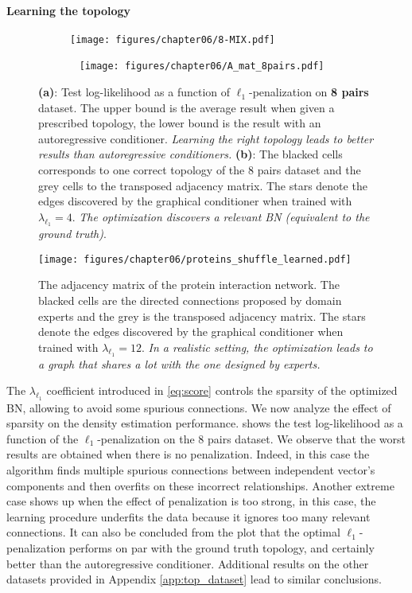 \paragraph{Learning the topology}
\begin{figure}
    \begin{subfigure}{.27\textwidth}
    \texttt{[image: figures/chapter06/8-MIX.pdf]}
    \caption{}\label{fig:8_MIX_L1_test}
    \end{subfigure}
    \begin{subfigure}{.2\textwidth}~
    \centering
        \texttt{[image: figures/chapter06/A\_mat\_8pairs.pdf]}
    \caption{}\label{fig:8_MIX_L1_DAG}
    \end{subfigure}
    \caption{\textbf{(a)}: Test log-likelihood as a function of $\ell_1$-penalization on \textbf{8 pairs} dataset. The upper bound is the average result when given a prescribed topology, the lower bound is the result with an autoregressive conditioner. \emph{Learning the right topology leads to better results than autoregressive conditioners.} \textbf{(b)}: The blacked cells corresponds to one correct topology of the 8 pairs dataset and the grey cells to the transposed adjacency matrix. The stars denote the edges discovered by the graphical conditioner when trained with $\lambda_{\ell_1} = 4$. \emph{The optimization discovers a relevant BN (equivalent to the ground truth)}.}
    \label{fig:8_MIX_L1}
\end{figure}
\begin{figure}
    \centering
    \texttt{[image: figures/chapter06/proteins\_shuffle\_learned.pdf]}
    \caption{The adjacency matrix of the protein interaction network. The blacked cells are the directed connections proposed by domain experts and the grey is the transposed adjacency matrix. The stars denote the edges discovered by the graphical conditioner when trained with  $\lambda_{\ell_1} = 12$. \emph{In a realistic setting, the optimization leads to a graph that shares a lot with the one designed by experts.}}    \label{fig:protein_net}

\end{figure}
The $\lambda_{\ell_1}$ coefficient introduced in \eqref{eq:score} controls the sparsity of the optimized BN, allowing to avoid some spurious connections. We now analyze the effect of sparsity on the density estimation performance.  shows the test log-likelihood as a function of the $\ell_1$-penalization on the 8 pairs dataset. We observe that the worst results are obtained when there is no penalization. Indeed, in this case the algorithm finds multiple spurious connections between independent vector's components and then overfits on these incorrect relationships. Another extreme case shows up when the effect of penalization is too strong, in this case, the learning procedure underfits the data because it ignores too many relevant connections. It can also be concluded from the plot that the optimal $\ell_1$-penalization performs on par with the ground truth topology, and certainly better than the autoregressive conditioner. Additional results on the other datasets provided in Appendix \ref{app:top_dataset} lead to similar conclusions.

